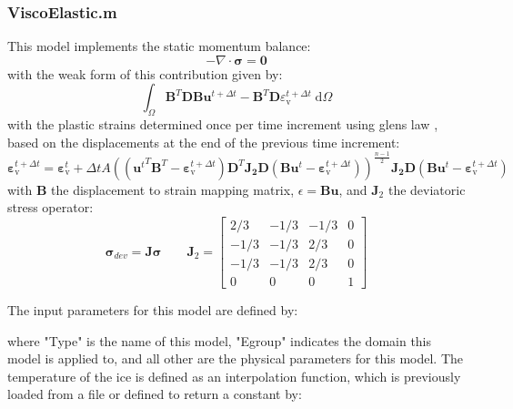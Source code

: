 \documentclass[3p]{elsarticle} %
\begin{document}
\subsubsection{ViscoElastic.m}
This model implements the static momentum balance:
\begin{equation}
-\nabla \cdot \bm{\sigma} = \bm{0} \label{eq:mom}
\end{equation}
with the weak form of this contribution given by:
\begin{equation}
\int_\Omega \bm{B}^T \bm{D} \bm{B}\bm{u}^{t+\Delta t} - \bm{B}^T \bm{D} \varepsilon_{\text{v}}^{t+\Delta t}\;\text{d}\Omega \label{eq:weak_mom}
\end{equation}
with the plastic strains determined once per time increment using glens law \citep{Glen1955,Weertman1983}, based on the displacements at the end of the previous time increment:
\begin{equation}
	\mathbf{\varepsilon}_{\text{v}}^{t+\Delta t} = \mathbf{\varepsilon}_{\text{v}}^{t}+\Delta t A \left( \left({\mathbf{u}^{t}}^T\bm{B}^T-\mathbf{\varepsilon}_{\text{v}}^{t+\Delta t}\right) \bm{D}^T \bm{J_2}\bm{D} \left(\bm{B} \mathbf{u}^t-\mathbf{\varepsilon}_{\text{v}}^{t+\Delta t}\right) \right)^{\frac{n-1}{2}}\bm{J_2}\bm{D} \left(\bm{B} \mathbf{u}^t-\mathbf{\varepsilon}_{\text{v}}^{t+\Delta t}\right)
\end{equation}
with $\bm{B}$ the displacement to strain mapping matrix, $\epsilon=\bm{B}\mathbf{u}$, and $\bm{J}_2$ the deviatoric stress operator:
\begin{equation}
	\mathbf{\sigma}_{dev} = \bm{J} \mathbf{\sigma} \qquad \bm{J}_2 = \begin{bmatrix} 2/3 & -1/3 & -1/3 & 0\\ -1/3 & -1/3 & 2/3 & 0 \\ -1/3 & -1/3 & 2/3 & 0 \\ 0 & 0 & 0 & 1 \end{bmatrix} 
\end{equation}

The input parameters for this model are defined by:

where "Type" is the name of this model, "Egroup" indicates the domain this model is applied to, and all other are the physical parameters for this model. The temperature of the ice is defined as an interpolation function, which is previously loaded from a file or defined to return a constant by:

\end{document}
